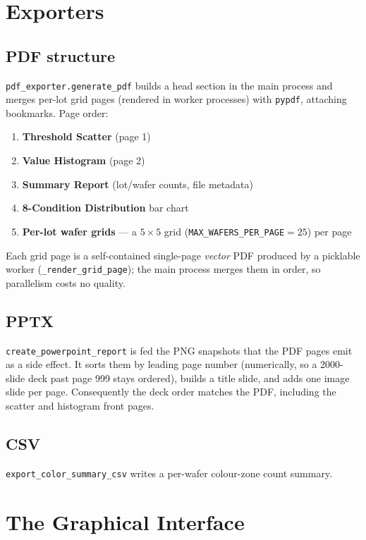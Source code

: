 \documentclass[11pt,a4paper]{report}
\newcommand{\code}[1]{\texttt{#1}}
\begin{document}
\chapter{Exporters}\label{ch:exporters}

\section{PDF structure}
\code{pdf\_exporter.generate\_pdf} builds a head section in the main process and
merges per-lot grid pages (rendered in worker processes) with \code{pypdf},
attaching bookmarks. Page order:

\begin{enumerate}[leftmargin=1.6em]
  \item \textbf{Threshold Scatter} (page 1)
  \item \textbf{Value Histogram} (page 2)
  \item \textbf{Summary Report} (lot/wafer counts, file metadata)
  \item \textbf{8-Condition Distribution} bar chart
  \item \textbf{Per-lot wafer grids} — a $5\times5$ grid (\code{MAX\_WAFERS\_PER\_PAGE}$=25$) per page
\end{enumerate}

Each grid page is a self-contained single-page \emph{vector} PDF produced by a
picklable worker (\code{\_render\_grid\_page}); the main process merges them in
order, so parallelism costs no quality.

\section{PPTX}
\code{create\_powerpoint\_report} is fed the PNG snapshots that the PDF pages
emit as a side effect. It sorts them by leading page number (numerically, so a
2000-slide deck past page 999 stays ordered), builds a title slide, and adds one
image slide per page. Consequently the deck order matches the PDF, including the
scatter and histogram front pages.

\section{CSV}
\code{export\_color\_summary\_csv} writes a per-wafer colour-zone count summary.

\chapter{The Graphical Interface}\label{ch:gui}
\end{document}
